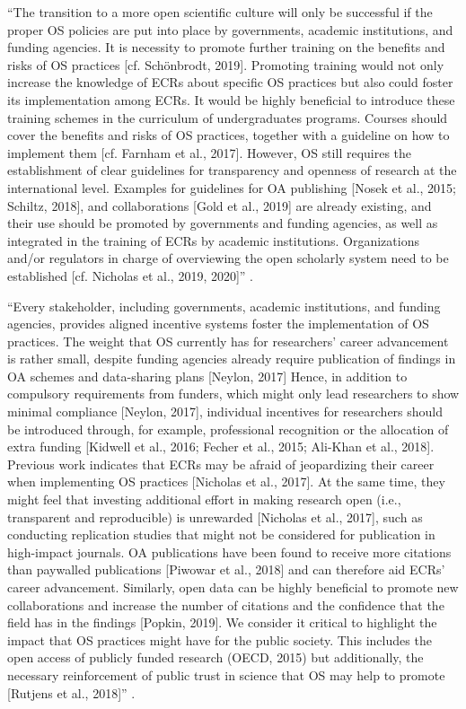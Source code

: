 ``The transition to a more open scientific culture will only be successful if
the proper OS policies are put into place by governments, academic institutions,
and funding agencies.
%
It is necessity to promote further training on the benefits and risks of OS
practices [cf. Schönbrodt, 2019].
%
Promoting training would not only increase the knowledge of ECRs about specific
OS practices but also could foster its implementation among ECRs.
%
It would be highly beneficial to introduce these training schemes in the
curriculum of undergraduates programs.
%
Courses should cover the benefits and risks of OS practices, together with a
guideline on how to implement them [cf. Farnham et al., 2017].
%
However, OS still requires the establishment of clear guidelines for
transparency and openness of research at the international level.
%
Examples for guidelines for OA publishing [Nosek et al., 2015; Schiltz, 2018],
and collaborations [Gold et al., 2019] are already existing, and their use
should be promoted by governments and funding agencies, as well as integrated in
the training of ECRs by academic institutions.
%
Organizations and/or regulators in charge of overviewing the open scholarly
system need to be established [cf. Nicholas et al., 2019, 2020]''
\citep{toribio2021early}.

``Every stakeholder, including governments, academic institutions, and funding
agencies, provides aligned incentive systems foster the implementation of OS
practices.
%
The weight that OS currently has for researchers’ career advancement is rather
small, despite funding agencies already require publication of findings in OA
schemes and data-sharing plans [Neylon, 2017]
%
Hence, in addition to compulsory requirements from funders, which might only
lead researchers to show minimal compliance [Neylon, 2017], individual
incentives for researchers should be introduced through, for example,
professional recognition or the allocation of extra funding [Kidwell et al.,
2016; Fecher et al., 2015; Ali-Khan et al., 2018].
%
Previous work indicates that ECRs may be afraid of jeopardizing their career
when implementing OS practices [Nicholas et al., 2017].
%
At the same time, they might feel that investing additional effort in making
research open (i.e., transparent and reproducible) is unrewarded [Nicholas et
al., 2017], such as conducting replication studies that might not be considered
for publication in high-impact journals.
%
OA publications have been found to receive more citations than paywalled
publications [Piwowar et al., 2018] and can therefore aid ECRs’ career
advancement.
%
Similarly, open data can be highly beneficial to promote new collaborations and
increase the number of citations and the confidence that the field has in the
findings [Popkin, 2019].
%
We consider it critical to highlight the impact that OS practices might have for
the public society.
%
This includes the open access of publicly funded research (OECD, 2015) but
additionally, the necessary reinforcement of public trust in science that OS may
help to promote [Rutjens et al., 2018]'' \citep{toribio2021early}.


